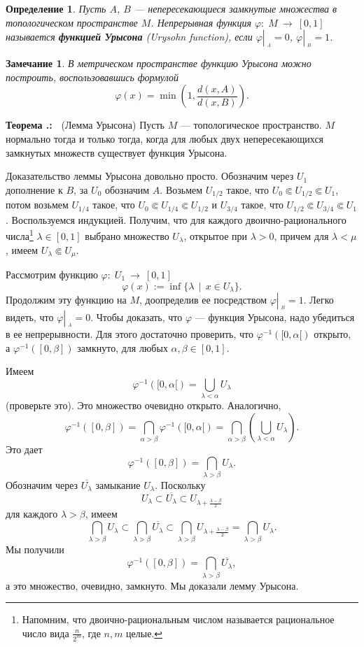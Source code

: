 \documentclass[12pt]{book}
\newcommand{\arrow}{{\:\longrightarrow\:}}
\newcommand{\restrict}[1]{{\left|_{{\phantom{|}\!\!}_{#1}}\right.}}
\renewcommand{\phi}{\varphi}
\theoremstyle{upshape}
\newtheorem{zadacha}{Задача}[chapter]
\theoremstyle{generic}
\newtheorem{opredelenie}[teorema]{Определение}
\newtheorem{remark}[teorema]{Замечание}
\def\замечание{\begin{remark}}
\def\еза{\end{remark}}
\theoremstyle{upshapenonumber}
\newcommand{\следствие}{%
     \refstepcounter{teorema}
     {\noindent\bf Следствие \thechapter.\arabic{teorema}:\ }}
\newcommand{\пример}{%
     \refstepcounter{teorema}
     {\noindent\bf Пример \thechapter.\arabic{teorema}:\ }}
\newcommand{\лемма}{%
     \refstepcounter{teorema}
     {\noindent\bf Лемма \thechapter.\arabic{teorema}:\ }}
\newcommand{\теорема}{%
     \refstepcounter{teorema}
     {\noindent\bf Теорема \thechapter.\arabic{teorema}:\ }}
\newcommand{\утверждение}{%
     \refstepcounter{teorema}
     {\noindent\bf Утверждение \thechapter.\arabic{teorema}:\ }}
\def\хфилл{\hfill}
\def\бф{\bf}
\def\ем{\em}
\def\задача{\begin{zadacha}}
\def\ез{\end{zadacha}}
\def\еу{\end{ukazanie}}
\def\определение{\begin{opredelenie}}
\def\ео{\end{opredelenie}}
\def\енум{\begin{enumerate}}
\def\ее{\end{enumerate}}
\begin{document}
\определение 
Пусть $A$, $B$ --- непересекающиеся замкнутые множества
в топологическом пространстве $M$. Непрерывная функция
$\phi:\; M \arrow [0,1]$ называется {\бф функцией Урысона}
(Urysohn function),
если $\phi \restrict A =0$, $\phi\restrict B =1$.
\ео

\хфилл

\замечание 
В метрическом пространстве функцию Урысона можно построить,
воспользовавшись формулой
\[
\phi(x) = \min\left(1, \frac{d(x,A)}{d(x,B)}\right).
\]
\еза

\хфилл

\теорема 
(Лемма Урысона)
Пусть $M$ --- топологическое пространство.
$M$ нормально тогда и только тогда, когда 
для любых двух непересекающихся замкнутых
множеств существует функция Урысона.

\хфилл

Доказательство леммы Урысона довольно просто. 
Обозначим через $U_1$ дополнение к $B$, за $U_0$ обозначим $A$.
Возьмем $U_{1/2}$ такое, что 
$U_0\Subset U_{1/2} \Subset U_1$, потом возьмем
$U_{1/4}$ такое, что $U_0\Subset U_{1/4}\Subset U_{1/2}$
и $U_{3/4}$ такое, что $U_{1/2} \Subset U_{3/4}\Subset U_1$.
Воспользуемся индукцией. Получим, что для каждого
двоично-рационального числа\footnote{Напомним, что
двоично-рациональным числом называется рациональное
число вида $\frac n {2^m}$, где $n,m$ целые.} 
$\lambda\in [0,1]$ выбрано множество $U_\lambda$, открытое при $\lambda>0$,
причем для $\lambda < \mu$, имеем $U_\lambda \Subset U_\mu$.

Рассмотрим функцию $\phi:\; U_1 \arrow [0,1]$
\[
\phi(x):= \inf \{ \lambda \ \ |\ \ x\in U_\lambda\}.
\]
Продолжим эту функцию на $M$, доопределив ее
посредством $\phi\restrict B=1$.
Легко видеть, что $\phi\restrict A=0$.
Чтобы доказать, что $\phi$ --- функция Урысона, надо 
убедиться в ее непрерывности. Для этого достаточно
проверить, что $\phi^{-1}([0,\alpha[)$ открыто, а
$\phi^{-1}([0,\beta])$ замкнуто, для любых
$\alpha, \beta \in [0,1]$.

Имеем 
\[ \phi^{-1}([0,\alpha[) = \bigcup_{\lambda < \alpha} U_\lambda\]
(проверьте это). Это множество очевидно открыто. 
Аналогично,
\[
\phi^{-1}([0,\beta])=\bigcap_{\alpha > \beta} \phi^{-1}([0,\alpha[) =
\bigcap_{\alpha > \beta} \left(\bigcup_{\lambda < \alpha} U_\lambda\right).
\]
Это дает
\[
\phi^{-1}([0,\beta]) =\bigcap_{\lambda > \beta} U_\lambda.
\]
Обозначим через $\overline{U_\lambda}$ замыкание $U_\lambda.$
Поскольку 
\[ U_{\lambda}\subset 
\overline{U_\lambda}\subset U_{\lambda+\frac {\lambda-\beta}2}\]
для каждого $\lambda > \beta$, имеем
\[ 
\bigcap_{\lambda > \beta} U_\lambda \subset 
\bigcap_{\lambda > \beta}\overline{U_\lambda} \subset 
\bigcap_{\lambda > \beta}U_{\lambda+\frac {\lambda-\beta}2}=
\bigcap_{\lambda > \beta} U_\lambda.
\]
Мы получили 
\[
\phi^{-1}([0,\beta])= \bigcap_{\lambda > \beta}\overline{U_\lambda},
\]
а это множество, очевидно, замкнуто. 
Мы доказали лемму Урысона.
\end{document}
